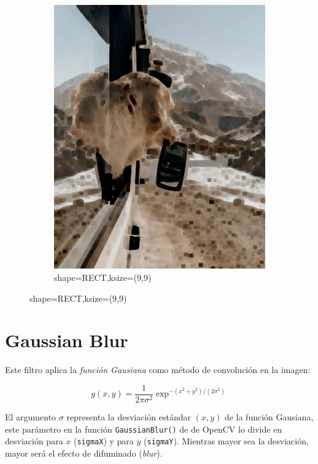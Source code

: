 \documentclass[a4paper, 12pt]{article}
\begin{document}
\begin{figure}[!ht]
\begin{subfigure}{0.4\textwidth}
        \includegraphics[width=\textwidth]{img/dog-erode.png}
        \caption{shape=RECT,ksize=(9,9)}
    \end{subfigure}
\end{figure}

\section{Gaussian Blur}
Este filtro aplica la \emph{función Gausiana} como método de convolución en la imagen:

\begin{equation}
    g(x,y)=\frac{1}{2\pi \sigma^2}\exp^{-(x^2+y^2)/(2\sigma^2)}
\end{equation}

El argumento $\sigma$ representa la desviación estándar $(x,y)$ de la función Gausiana, este parámetro en la función \lstinline{GaussianBlur()} de de OpenCV lo divide en desviación para $x$ (\lstinline{sigmaX}) y para $y$ (\lstinline{sigmaY}). Mientras mayor sea la desviación, mayor será el efecto de difuminado (\emph{blur}).
\end{document}
